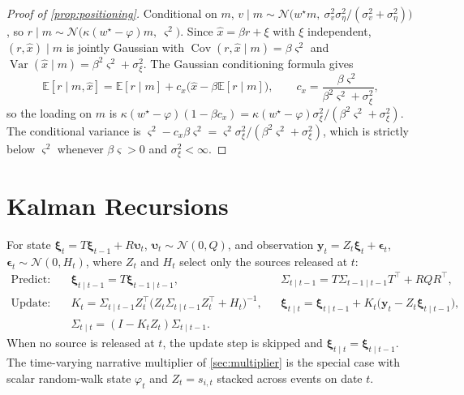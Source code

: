 \documentclass[11pt,a4paper]{article}
\theoremstyle{plain}
\theoremstyle{definition}
\theoremstyle{remark}
\newcommand{\E}{\mathbb{E}}
\newcommand{\N}{\mathcal{N}}
\DeclareMathOperator{\Var}{Var}
\DeclareMathOperator{\Cov}{Cov}
\begin{document}
\begin{proof}[Proof of \cref{prop:positioning}]
Conditional on $m$, $v\mid m\sim\N\big(w^\star m,\ \sigma_v^2\sigma_\eta^2/(\sigma_v^2+\sigma_\eta^2)\big)$, so $r\mid m\sim\N\big(\kappa(w^\star-\varphi)m,\ \varsigma^2\big)$. Since $\hat x=\beta r+\xi$ with $\xi$ independent, $(r,\hat x)\mid m$ is jointly Gaussian with $\Cov(r,\hat x\mid m)=\beta\varsigma^2$ and $\Var(\hat x\mid m)=\beta^2\varsigma^2+\sigma_\xi^2$. The Gaussian conditioning formula gives
\[
\E[r\mid m,\hat x]=\E[r\mid m]+c_x\big(\hat x-\beta\E[r\mid m]\big),\qquad c_x=\frac{\beta\varsigma^2}{\beta^2\varsigma^2+\sigma_\xi^2},
\]
so the loading on $m$ is $\kappa(w^\star-\varphi)(1-\beta c_x)=\kappa(w^\star-\varphi)\sigma_\xi^2/(\beta^2\varsigma^2+\sigma_\xi^2)$. The conditional variance is $\varsigma^2-c_x\beta\varsigma^2=\varsigma^2\sigma_\xi^2/(\beta^2\varsigma^2+\sigma_\xi^2)$, which is strictly below $\varsigma^2$ whenever $\beta\varsigma>0$ and $\sigma_\xi^2<\infty$.
\end{proof}

\section{Kalman Recursions}\label{app:kalman}
For state $\bm\xi_t=T\bm\xi_{t-1}+R\bm\upsilon_t$, $\bm\upsilon_t\sim\N(0,Q)$, and observation $\bm y_t=Z_t\bm\xi_t+\bm\epsilon_t$, $\bm\epsilon_t\sim\N(0,H_t)$, where $Z_t$ and $H_t$ select only the sources released at $t$:
\begin{align*}
\text{Predict:}\quad & \bm\xi_{t\mid t-1}=T\bm\xi_{t-1\mid t-1}, && \Sigma_{t\mid t-1}=T\Sigma_{t-1\mid t-1}T^\top+RQR^\top,\\
\text{Update:}\quad & K_t=\Sigma_{t\mid t-1}Z_t^\top\big(Z_t\Sigma_{t\mid t-1}Z_t^\top+H_t\big)^{-1}, && \bm\xi_{t\mid t}=\bm\xi_{t\mid t-1}+K_t\big(\bm y_t-Z_t\bm\xi_{t\mid t-1}\big),\\
& \Sigma_{t\mid t}=(I-K_tZ_t)\Sigma_{t\mid t-1}.
\end{align*}
When no source is released at $t$, the update step is skipped and $\bm\xi_{t\mid t}=\bm\xi_{t\mid t-1}$. The time-varying narrative multiplier of \cref{sec:multiplier} is the special case with scalar random-walk state $\varphi_t$ and $Z_t=s_{i,t}$ stacked across events on date $t$.
\end{document}
